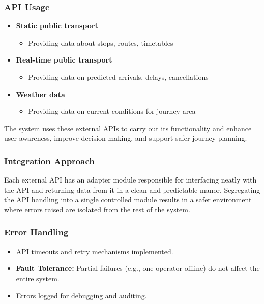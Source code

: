 \documentclass{article}
\begin{document}
\subsubsection{API Usage}
\begin{itemize}[itemsep=2pt, topsep=4pt, parsep=0pt]
    \item \textbf{Static public transport}
    \begin{itemize}[itemsep=2pt, topsep=4pt, parsep=0pt]
        \item Providing data about stops, routes, timetables  
    \end{itemize}
    \item \textbf{Real-time public transport}
    \begin{itemize}[itemsep=2pt, topsep=4pt, parsep=0pt]
        \item Providing data on predicted arrivals, delays, cancellations 
    \end{itemize}
    \item \textbf{Weather data}
    \begin{itemize}[itemsep=2pt, topsep=4pt, parsep=0pt]
        \item Providing data on current conditions for journey area 
    \end{itemize}
\end{itemize}
\noindent
The system uses these external APIs to carry out its functionality and enhance user awareness, improve decision-making, and support safer journey planning. 

\subsubsection{Integration Approach}
Each external API has an adapter module responsible for interfacing neatly with the API and returning data from it in a clean and predictable manor. Segregating the API handling into a single controlled module results in a safer environment where errors raised are isolated from the rest of the system.

\subsubsection{Error Handling}
\begin{itemize}[label=--]
    \item API timeouts and retry mechanisms implemented.
    \item \textbf{Fault Tolerance:} Partial failures (e.g., one operator offline) do not affect the entire system.
    \item Errors logged for debugging and auditing.
\end{itemize}
\end{document}
